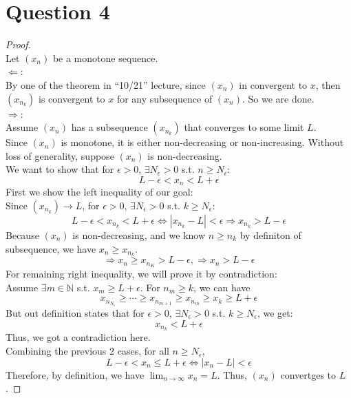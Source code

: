 \documentclass{article}
\begin{document}
\section*{Question 4}
\begin{proof}
    \hspace{0.001cm}
    \\
    Let $(x_n)$ be a monotone sequence.
    \\
    $\Leftarrow$: 
    \\
    By one of the theorem in ``10/21'' lecture, since $(x_n)$ in convergent to $x$, then $(x_{n_k})$ is convergent to $x$ for any subsequence of $(x_n)$.
    So we are done.
    \\
    $\Rightarrow$:
    \\
    Assume $(x_n)$ has a subsequence $(x_{n_k})$ that converges to some limit $L$.
    \\
    Since $(x_n)$ is monotone, it is either non-decreasing or non-increasing. Without loss of generality, suppose $(x_n)$ is non-decreasing.
    \\
    We want to show that for $\epsilon > 0$, $\exists N_{\epsilon} > 0$ s.t. $n \geq N_{\epsilon}$:
    \[ L - \epsilon < x_n < L + \epsilon \]
    First we show the left inequality of our goal: 
    \\
    Since $(x_{n_k}) \rightarrow L$, for $\epsilon > 0$, $\exists N_{\epsilon} > 0$ s.t. $k \geq N_{\epsilon}$:
    \[ L - \epsilon  < x_{n_k} < L + \epsilon \Leftrightarrow |x_{n_k} - L| < \epsilon \Longrightarrow x_{n_k} > L - \epsilon \]
    Because $(x_n)$ is non-decreasing, and we know $n \geq n_k$ by definiton of subsequence, we have \( x_n \geq x_{n_k} \).
    \[ \Rightarrow x_n \geq x_{n_K} > L - \epsilon, \Rightarrow x_n > L - \epsilon \]
    For remaining right inequality, we will prove it by contradiction:
    \\
    Assume $\exists m \in \mathbb{N}$ s.t. $x_m \geq L + \epsilon$. For $n_m \geq k$, we can have
    \[ x_{n_{N_{\epsilon}}} \geq \cdots \geq x_{n_{m + 1}} \geq x_{n_m} \geq x_k \geq L + \epsilon \]
    But out definition states that for $\epsilon > 0$, $\exists N_{\epsilon} > 0$ s.t. $k \geq N_{\epsilon}$, we get:
    \[ x_{n_k} < L + \epsilon \]
    Thus, we got a contradiction here.
    \\
    Combining the previous 2 cases, for all $n \geq N_{\epsilon}$,
    \[ L - \epsilon < x_n \leq L + \epsilon \Leftrightarrow |x_n - L| < \epsilon \]
    Therefore, by definition, we have $\lim_{n \rightarrow \infty} x_n = L$. Thus, $(x_n)$ convertges to $L$.
\end{proof}
\end{document}
